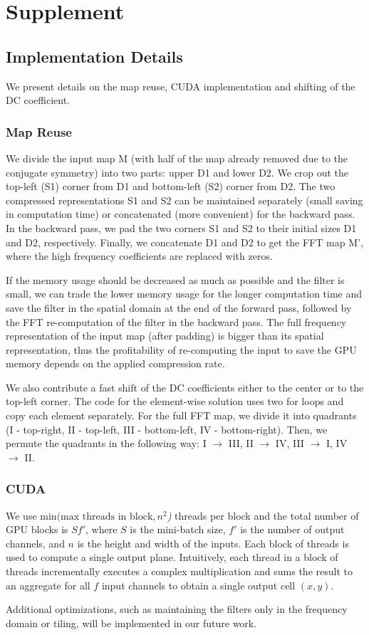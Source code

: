 \section{Supplement}

\subsection{Implementation Details}
We present details on the map reuse, CUDA implementation and shifting of the DC coefficient.

\subsubsection{Map Reuse}
We divide the input map M (with half of the map already removed due to the conjugate symmetry) into two parts: upper D1 and lower D2. We crop out the top-left (S1) corner from D1 and bottom-left (S2) corner from D2. The two compressed representations S1 and S2 can be maintained separately (small saving in computation time) or concatenated (more convenient) for the backward pass. In the backward pass, we pad the two corners S1 and S2 to their initial sizes D1 and D2, respectively. Finally, we concatenate D1 and D2 to get the FFT map M', where the high frequency coefficients are replaced with zeros.

If the memory usage should be decreased as much as possible and the filter is small, we can trade the lower memory usage for the longer computation time and save the filter in the spatial domain at the end of the forward pass, followed by the FFT re-computation of the filter in the backward pass. The full frequency representation of the input map (after padding) is bigger than its spatial representation, thus the profitability of re-computing the input to save the GPU memory depends on the applied compression rate.

We also contribute a fast shift of the DC coefficients either to the center or to the top-left corner. The code for the element-wise solution uses two for loops and copy each element separately. For the full FFT map, we divide it into quadrants (I - top-right, II - top-left, III - bottom-left, IV - bottom-right). Then, we permute the quadrants in the following way: I $\rightarrow$ III, II $\rightarrow$ IV, III $\rightarrow$ I, IV $\rightarrow$ II.


\subsubsection{CUDA}
We use \textit{$\text{min}(\text{max threads in block}, n^2$)} threads per block and the total number of GPU blocks is $Sf'$, where $S$
is the mini-batch size,
$f'$
is the number of output channels, and $n$ is the height and width of the inputs. Each block of threads is used to compute a single output plane. Intuitively, each thread in a block of threads incrementally executes a complex multiplication and sums the result to an aggregate for all $f$ input channels to obtain a single output cell $(x,y)$.

Additional optimizations, such as maintaining the filters only in the frequency domain or tiling, will be implemented in our future work.
